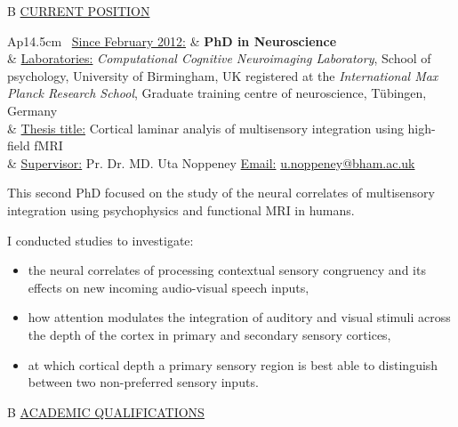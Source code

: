 \documentclass[a4paper,12pt,oneside]{letter}
\begin{document}
{%





\medskip 

\begin{tabular}{B}
\underline{CURRENT POSITION}
\end{tabular}

\begin{tabular}{Ap{14.5cm}}
\textbullet~\underline{Since February 2012:} 	& \hfill \large\textbf{PhD in Neuroscience} \\
						& \underline{Laboratories:} \newline
						\textit{Computational Cognitive Neuroimaging Laboratory}, School of psychology, University of Birmingham, UK \newline
						registered at the \textit{International Max Planck Research School}, Graduate training centre of neuroscience, Tübingen, Germany \\
						& \underline{Thesis title:} Cortical laminar analyis of multisensory integration using high-field fMRI\\
						& \underline{Supervisor:} Pr. Dr. MD. Uta Noppeney \underline{Email:} \href{mailto:u.noppeney@bham.ac.uk}{u.noppeney@bham.ac.uk}
\end{tabular}


\medskip 

This second PhD focused on the study of the neural correlates of multisensory integration using psychophysics and functional MRI in humans. 

I conducted studies to investigate:
\begin{itemize}
 \item the neural correlates of processing contextual sensory congruency and its effects on new incoming audio-visual speech inputs,
 \item how attention modulates the integration of auditory and visual stimuli across the depth of the cortex in primary and secondary sensory cortices,
 \item at which cortical depth a primary sensory region is best able to distinguish between two non-preferred sensory inputs.
\end{itemize}

\pagebreak

\begin{tabular}{B}
\underline{ACADEMIC QUALIFICATIONS}
\end{tabular}


}
\end{document}
